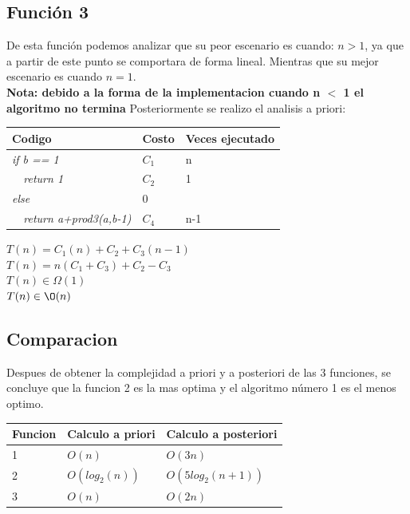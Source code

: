 \documentclass[spanish]{article}
\begin{document}
				\subsection*{Función 3}
					De esta función podemos analizar que su peor escenario es cuando: $n>1$, ya que a partir de este punto se comportara de forma lineal. Mientras que su mejor escenario es cuando $n=1$.\\
					\textbf{Nota: debido a la forma de la implementacion cuando n $<$ 1 el algoritmo no termina}
					Posteriormente se realizo el analisis a priori:\\
					\begin{center}
						\begin{table}[H]
							\begin{tabular}{|l|l|l|}
								\hline
								\rowcolor[HTML]{FFCC67} 
								Codigo                               & Costo & Veces ejecutado \\ \hline
								\textit{if b == 1}                   & $C_1$   & n               \\ \hline
								\textit{\  \  return 1}              & $C_2$   & 1               \\ \hline
								\textit{else}                        & 0     &                 \\ \hline
								\textit{\  \  return a+prod3(a,b-1)} & $C_4$   & n-1             \\ \hline
							\end{tabular}
						\end{table}
						$T(n) = C_1(n) + C_2 + C_3(n-1)$\\
						$T(n) = n(C_1+C_3) + C_2 - C_3$\\
						$T(n) \in \Omega(1)$\\
						$T(n) \in \O(n)$
					\end{center}
				\subsection*{Comparacion}
				Despues de obtener la complejidad a priori y a posteriori de las 3 funciones, se concluye que la funcion 2 es la mas optima y el algoritmo número 1 es el menos optimo.
				\begin{table}[H]
					\begin{tabular}{|l|l|l|}
						\hline
						\rowcolor[HTML]{FFCC67} 
						Funcion & Calculo a priori & Calculo a posteriori \\ \hline
						\rowcolor[HTML]{FE0000} 
						1       & $O(n)$           & $O(3n)$              \\ \hline
						\rowcolor[HTML]{32CB00} 
						2       & $O(log_2(n))$    & $O(5log_2(n+1))$     \\ \hline
						\rowcolor[HTML]{F8FF00} 
						3       & $O(n)$           & $O(2n)$              \\ \hline
					\end{tabular}
				\end{table}
\end{document}
